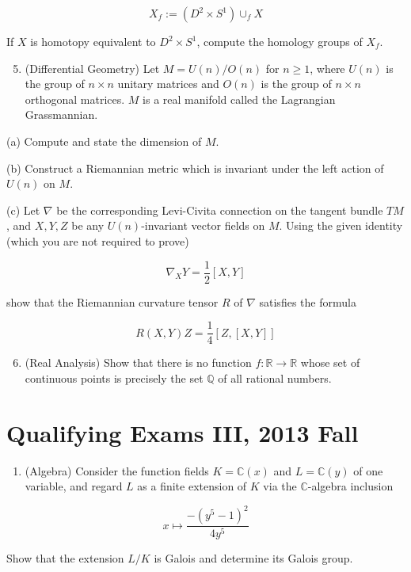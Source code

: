 \documentclass[10pt]{article}
\begin{document}
$$
X_{f}:=\left(D^{2} \times S^{1}\right) \cup_{f} X
$$

If $X$ is homotopy equivalent to $D^{2} \times S^{1}$, compute the homology groups of $X_{f}$.

\begin{enumerate}
  \setcounter{enumi}{4}
  \item (Differential Geometry) Let $M=U(n) / O(n)$ for $n \geq 1$, where $U(n)$ is the group of $n \times n$ unitary matrices and $O(n)$ is the group of $n \times n$ orthogonal matrices. $M$ is a real manifold called the Lagrangian Grassmannian.
\end{enumerate}

(a) Compute and state the dimension of $M$.

(b) Construct a Riemannian metric which is invariant under the left action of $U(n)$ on $M$.

(c) Let $\nabla$ be the corresponding Levi-Civita connection on the tangent bundle $T M$, and $X, Y, Z$ be any $U(n)$-invariant vector fields on $M$. Using the given identity (which you are not required to prove)

$$
\nabla_{X} Y=\frac{1}{2}[X, Y]
$$

show that the Riemannian curvature tensor $R$ of $\nabla$ satisfies the formula

$$
R(X, Y) Z=\frac{1}{4}[Z,[X, Y]]
$$

\begin{enumerate}
  \setcounter{enumi}{5}
  \item (Real Analysis) Show that there is no function $f: \mathbb{R} \rightarrow \mathbb{R}$ whose set of continuous points is precisely the set $\mathbb{Q}$ of all rational numbers.
\end{enumerate}

\section{Qualifying Exams III, 2013 Fall}
\begin{enumerate}
  \item (Algebra) Consider the function fields $K=\mathbb{C}(x)$ and $L=\mathbb{C}(y)$ of one variable, and regard $L$ as a finite extension of $K$ via the $\mathbb{C}$-algebra inclusion
\end{enumerate}

$$
x \mapsto \frac{-\left(y^{5}-1\right)^{2}}{4 y^{5}}
$$

Show that the extension $L / K$ is Galois and determine its Galois group.
\end{document}
